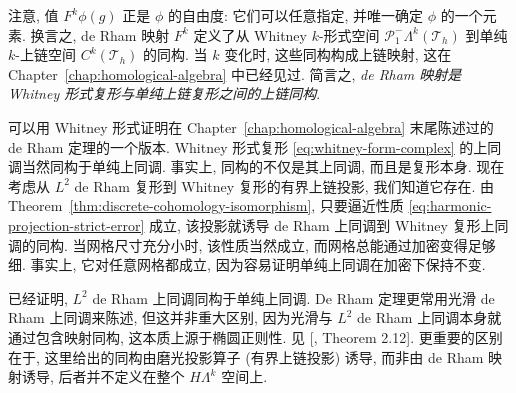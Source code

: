 {注意, 值 $F^k\phi(g)$ 正是 $\phi$ 的自由度: 它们可以任意指定, 并唯一确定 $\phi$ 的一个元素. 换言之, de Rham 映射 $F^k$ 定义了从 Whitney $k$-形式空间 $\mathcal P_1^-\Lambda^k(\mathcal T_h)$ 到单纯 $k$-上链空间 $C^k(\mathcal T_h)$ 的同构. 当 $k$ 变化时, 这些同构构成上链映射, 这在 Chapter~\ref{chap:homological-algebra} 中已经见过. 简言之, \emph{de Rham 映射是 Whitney 形式复形与单纯上链复形之间的上链同构}.}

{可以用 Whitney 形式证明在 Chapter~\ref{chap:homological-algebra} 末尾陈述过的 de Rham 定理的一个版本. Whitney 形式复形 \eqref{eq:whitney-form-complex} 的上同调当然同构于单纯上同调. 事实上, 同构的不仅是其上同调, 而且是复形本身. 现在考虑从 $L^2$ de Rham 复形到 Whitney 复形的有界上链投影, 我们知道它存在. 由 Theorem~\ref{thm:discrete-cohomology-isomorphism}, 只要逼近性质 \eqref{eq:harmonic-projection-strict-error} 成立, 该投影就诱导 de Rham 上同调到 Whitney 复形上同调的同构. 当网格尺寸充分小时, 该性质当然成立, 而网格总能通过加密变得足够细. 事实上, 它对任意网格都成立, 因为容易证明单纯上同调在加密下保持不变.}

\begin{Remark}\label{rem:de-rham-cohomology-isomorphism}
{已经证明, $L^2$ de Rham 上同调同构于单纯上同调. De Rham 定理更常用光滑 de Rham 上同调来陈述, 但这并非重大区别, 因为光滑与 $L^2$ de Rham 上同调本身就通过包含映射同构, 这本质上源于椭圆正则性. 见 [, Theorem 2.12]. 更重要的区别在于, 这里给出的同构由磨光投影算子 (有界上链投影) 诱导, 而非由 de Rham 映射诱导, 后者并不定义在整个 $H\Lambda^k$ 空间上.}
\end{Remark}
